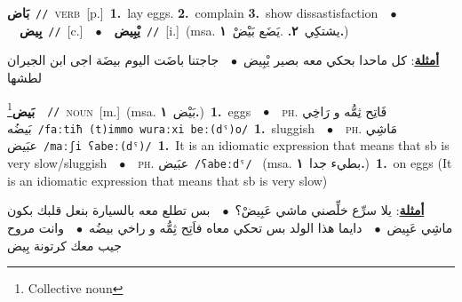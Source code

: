 \documentclass[10pt,a4paper,twoside]{article} %
\begin{document}
\begin{multicols}{2}
{\setlength\topsep{0pt}\textbf{\foreignlanguage{arabic}{بَاض}}\ {\color{gray}\texttt{//}\color{black}}\ \textsc{verb}\ [p.]\ \textbf{1.}~lay eggs.  \textbf{2.}~complain  \textbf{3.}~show dissastisfaction\ \ $\bullet$\ \ \setlength\topsep{0pt}\textbf{\foreignlanguage{arabic}{بِيض}}\ {\color{gray}\texttt{//}\color{black}}\ [c.]\ \ $\bullet$\ \ \setlength\topsep{0pt}\textbf{\foreignlanguage{arabic}{يْبِيض}}\ {\color{gray}\texttt{//}\color{black}}\ [i.]\ \color{gray}(msa. \foreignlanguage{arabic}{يشتكِي}~\foreignlanguage{arabic}{\textbf{٢.}}  .\foreignlanguage{arabic}{يَضَع بَيْضْ}~\foreignlanguage{arabic}{\textbf{١.}})\color{black}\  \begin{flushright}\color{gray}\foreignlanguage{arabic}{\textbf{\underline{\foreignlanguage{arabic}{أمثلة}}}: كل ماحدا بحكي معه بصير يْبِيض\ $\bullet$\ \  جاجتنا باضَت اليوم بيضَة اجى ابن الجيران لطشها}\end{flushright}\color{black}} \vspace{2mm}

{\setlength\topsep{0pt}\textbf{\foreignlanguage{arabic}{بَيض}}\footnote{Collective noun}\ \ {\color{gray}\texttt{//}\color{black}}\ \textsc{noun}\ [m.]\ \color{gray}(msa. \foreignlanguage{arabic}{بَيْض}~\foreignlanguage{arabic}{\textbf{١.}})\color{black}\ \textbf{1.}~eggs\ \ $\bullet$\ \ \textsc{ph.} \color{gray} \foreignlanguage{arabic}{فَاتِح ثِمُّه و رَاخِي بَيضُه}\color{black}\ {\color{gray}\texttt{/{\sffamily faːtiħ (t)immo wuraːxi beː(dˤ)o}/}\color{black}}\ \textbf{1.}~sluggish\ \ $\bullet$\ \ \textsc{ph.} \color{gray} \foreignlanguage{arabic}{مَاشِي عبَيض}\color{black}\ {\color{gray}\texttt{/{\sffamily maːʃi ʕabeː(dˤ)}/}\color{black}}\ \textbf{1.}~It is an idiomatic expression that means that sb is very slow/sluggish\ \ $\bullet$\ \ \textsc{ph.} \color{gray} \foreignlanguage{arabic}{عبَيض}\color{black}\ {\color{gray}\texttt{/{\sffamily ʕabeːdˤ}/}\color{black}}\ \color{gray} (msa. \foreignlanguage{arabic}{بطيء جدا}~\foreignlanguage{arabic}{\textbf{١.}})\color{black}\ \textbf{1.}~on eggs (It is an idiomatic expression that means that sb is very slow)\  \begin{flushright}\color{gray}\foreignlanguage{arabic}{\textbf{\underline{\foreignlanguage{arabic}{أمثلة}}}: يلا سرِّع خلِّصني ماشي عَبِيضْ؟\ $\bullet$\ \  بس تطلع معه بالسيارة بنعل قلبك بكون ماشِي عَبِيض\ $\bullet$\ \  دايما هذا الولد بس تحكي معاه فاَتِح ثِمُّه و راخي بيضُه\ $\bullet$\ \  وانت مروح جيب معك كرتونة بِيض}\end{flushright}\color{black}} \vspace{2mm}


\end{multicols}
\end{document}

